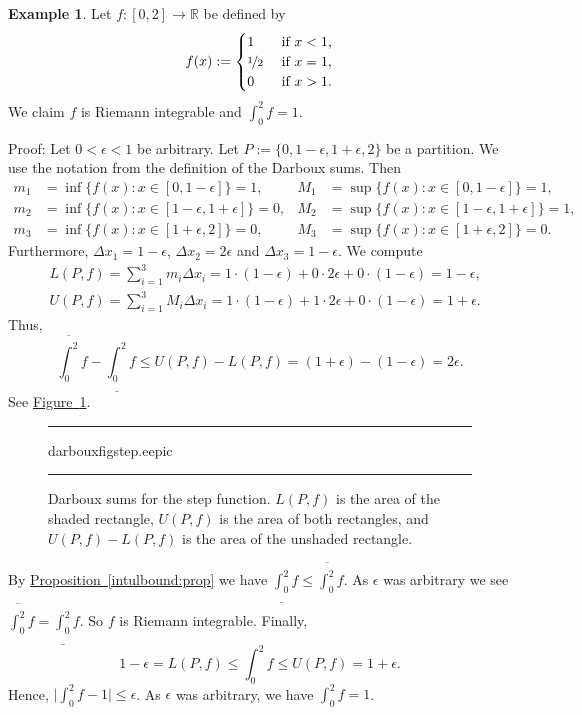 \documentclass[12pt]{book}
\newenvironment{myfigureht}{%
\begin{figure}[h!t]
\noindent\rule{\textwidth}{0.4pt}\vspace{12pt}\par\centering}%
{\par\noindent\rule{\textwidth}{0.4pt}
\end{figure}}
\newcommand{\R}{{\mathbb{R}}}
\theoremstyle{plain}
\theoremstyle{remark}
\theoremstyle{definition}
\theoremstyle{exercise}
\theoremstyle{example}
\newtheorem{example}[thm]{Example}
\newcommand{\figureref}[1]{\hyperref[#1]{Figure~\ref*{#1}}}
\newcommand{\propref}[1]{\hyperref[#1]{Proposition~\ref*{#1}}}
\begin{document}
\begin{example}
Let $f \colon [0,2] \to \R$ be defined by
\begin{equation*}
f(x) :=
\begin{cases}
1 & \text{ if $x < 1$,}\\
\nicefrac{1}{2} & \text{ if $x = 1$,}\\
0 & \text{ if $x > 1$.}
\end{cases}
\end{equation*}
We claim $f$ is Riemann integrable and $\int_0^2 f = 1$.

Proof: Let $0 < \epsilon < 1$ be arbitrary.
Let $P := \{0, 1-\epsilon, 1+\epsilon, 2\}$ be a partition.  We use the notation from
the definition of the Darboux sums.  Then
\begin{align*}
m_1 &= \inf \{ f(x) : x \in [0,1-\epsilon] \} = 1 , & 
M_1 &= \sup \{ f(x) : x \in [0,1-\epsilon] \} = 1 , \\
m_2 &= \inf \{ f(x) : x \in [1-\epsilon,1+\epsilon] \} = 0 , & 
M_2 &= \sup \{ f(x) : x \in [1-\epsilon,1+\epsilon] \} = 1 , \\
m_3 &= \inf \{ f(x) : x \in [1+\epsilon,2] \} = 0 , & 
M_3 &= \sup \{ f(x) : x \in [1+\epsilon,2] \} = 0 .
\end{align*}
Furthermore, $\Delta x_1 = 1-\epsilon$, $\Delta x_2 = 2\epsilon$ and
$\Delta x_3 = 1-\epsilon$.
We compute
\begin{align*}
& L(P,f) = \sum_{i=1}^3 m_i \Delta x_i =
1 \cdot (1-\epsilon) + 0 \cdot 2\epsilon + 0 \cdot (1-\epsilon)
= 1-\epsilon , \\
& U(P,f) = \sum_{i=1}^3 M_i \Delta x_i =
1 \cdot (1-\epsilon) + 1 \cdot 2\epsilon + 0 \cdot (1-\epsilon)
= 1+\epsilon .
\end{align*}
Thus,
\begin{equation*}
\overline{\int_0^2} f - 
\underline{\int_0^2} f
\leq
U(P,f) - L(P,f)
=
(1+\epsilon)
- (1-\epsilon) = 2 \epsilon .
\end{equation*}
See \figureref{darbouxfigstep}.
\begin{myfigureht}
{darbouxfigstep.eepic}
\caption{Darboux sums for the step function.  $L(P,f)$ is the area of the
shaded rectangle, $U(P,f)$ is the area of both rectangles, and
$U(P,f)-L(P,f)$ is the area of the unshaded rectangle.\label{darbouxfigstep}}
\end{myfigureht}
By \propref{intulbound:prop} we have $\underline{\int_0^2} f \leq \overline{\int_0^2} f$.
As $\epsilon$ was arbitrary we see 
$\overline{\int_0^2} f = \underline{\int_0^2} f$.  So $f$ is Riemann
integrable.  Finally,
\begin{equation*}
1-\epsilon = L(P,f) \leq \int_0^2 f \leq U(P,f) =
1+\epsilon.
\end{equation*}
Hence, $\bigl\lvert \int_0^2 f - 1 \bigr\rvert \leq \epsilon$.  As $\epsilon$ was arbitrary,
we have $\int_0^2 f = 1$.
\end{example}
\end{document}
